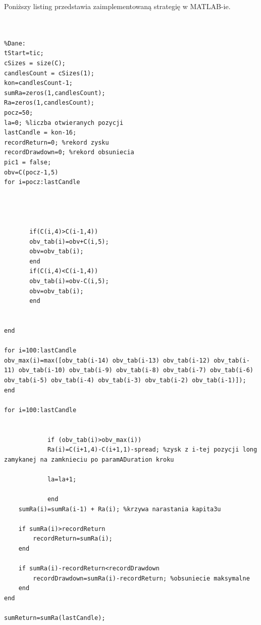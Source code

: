 \documentclass[12pt,a4paper]{article}
\begin{document}
\noindent Poniższy listing przedstawia zaimplementowaną strategię w MATLAB-ie.
\begin{scriptsize}
\begin{lstlisting}


%Dane:
tStart=tic;
cSizes = size(C);
candlesCount = cSizes(1);
kon=candlesCount-1;
sumRa=zeros(1,candlesCount);
Ra=zeros(1,candlesCount);
pocz=50;
la=0; %liczba otwieranych pozycji
lastCandle = kon-16;
recordReturn=0; %rekord zysku
recordDrawdown=0; %rekord obsuniecia
pic1 = false;
obv=C(pocz-1,5)
for i=pocz:lastCandle
 
   
    
    
       if(C(i,4)>C(i-1,4))
       obv_tab(i)=obv+C(i,5);
       obv=obv_tab(i);
       end
       if(C(i,4)<C(i-1,4))
       obv_tab(i)=obv-C(i,5);
       obv=obv_tab(i);
       end
       
        
end

for i=100:lastCandle
obv_max(i)=max([obv_tab(i-14) obv_tab(i-13) obv_tab(i-12) obv_tab(i-11) obv_tab(i-10) obv_tab(i-9) obv_tab(i-8) obv_tab(i-7) obv_tab(i-6) obv_tab(i-5) obv_tab(i-4) obv_tab(i-3) obv_tab(i-2) obv_tab(i-1)]);
end

for i=100:lastCandle
    
    
            if (obv_tab(i)>obv_max(i))
            Ra(i)=C(i+1,4)-C(i+1,1)-spread; %zysk z i-tej pozycji long zamykanej na zamknieciu po paramADuration kroku
            
            la=la+1;
      
            end
    sumRa(i)=sumRa(i-1) + Ra(i); %krzywa narastania kapita3u
    
    if sumRa(i)>recordReturn
        recordReturn=sumRa(i);
    end
    
    if sumRa(i)-recordReturn<recordDrawdown
        recordDrawdown=sumRa(i)-recordReturn; %obsuniecie maksymalne
    end
end

sumReturn=sumRa(lastCandle);




\end{lstlisting}
\end{scriptsize}
\end{document}
